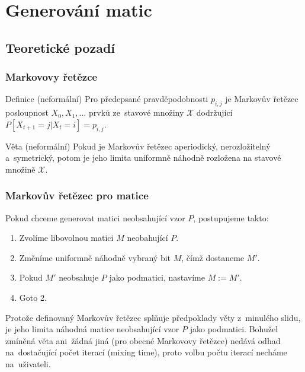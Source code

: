 \documentclass{beamer}
\begin{document}
\section{Generování matic}
\subsection{Teoretické pozadí}
\begin{frame}
\frametitle{Markovovy řetězce}
\begin{block}{Definice (neformální)}
Pro předepsané pravděpodobnosti $p_{i,j}$ je \alert{Markovův řetězec} posloupnost $X_0,X_1,\dots$ prvků ze~stavové množiny $\mathcal{X}$ dodržující $P[X_{t+1}=j|X_t=i]=p_{i,j}.$
\end{block}
\pause
\begin{block}{Věta (neformální)}
Pokud je Markovův řetězec aperiodický, nerozložitelný a~symetrický, potom je jeho limita uniformně náhodně rozložena na stavové množině $\mathcal{X}$.
\end{block}
\end{frame}

\begin{frame}
\frametitle{Markovův řetězec pro matice}
Pokud chceme generovat matici neobsahující vzor $P$, postupujeme takto:
\begin{enumerate}
\item Zvolíme libovolnou matici $M$ neobahující $P$.
\item Změníme uniformně náhodně vybraný bit $M$, čímž dostaneme $M'$.
\item \alert<3>{Pokud $M'$ neobsahuje $P$ jako podmatici}, nastavíme $M:=M'$.
\item Goto 2.
\end{enumerate}
\vspace{1em}
Protože definovaný Markovův řetězec splňuje předpoklady věty z~minulého slidu, je jeho limita náhodná matice neobsahující vzor $P$ jako podmatici. Bohužel zmíněná věta ani~žádná jiná (pro obecné Markovovy řetězce) nedává odhad na~dostačující počet iterací (mixing time), proto volbu počtu iterací necháme na~uživateli.
\end{frame}
\end{document}

